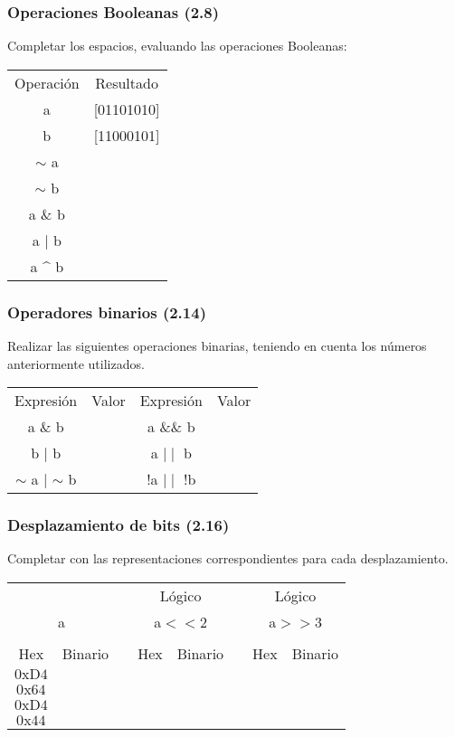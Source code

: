 \subsubsection{ Operaciones Booleanas (2.8)}
Completar los espacios, evaluando las operaciones Booleanas:\\

\begin{tabular}{cc}
  Operación&Resultado\\
  a&[01101010]\\
  b&[11000101]\\
  $\sim$ a&\underspace \\
  $\sim$ b&\underspace \\
  a \& b&\underspace\\
  a $\mid$ b&\underspace\\
  a \^{} b&\underspace\\
\end{tabular}

\subsubsection{Operadores binarios (2.14)}
Realizar las siguientes operaciones binarias, teniendo en cuenta los números anteriormente utilizados.\\

\begin{tabular}{cccc}
  Expresión&Valor&Expresión&Valor\\
  a \& b&\underspace &a \&\& b &\underspace\\
  b $\mid$ b&\underspace& a $\mid\mid$ b &\underspace\\
  $\sim$ a $\mid$ $\sim$ b&\underspace& !a $\mid\mid$ !b &\underspace \\
\end{tabular}


\subsubsection{Desplazamiento de bits (2.16)}
Completar con las representaciones correspondientes para cada desplazamiento.\\

\begin{tabular}{cccccccc}
  \multicolumn{2}{c}{ }& &\multicolumn{2}{c}{Lógico}& &\multicolumn{2}{c}{Lógico}\\
  \multicolumn{2}{c}{a}& &\multicolumn{2}{c}{a$<<$2}& &\multicolumn{2}{c}{a$>>$3}\\
  \cline{1-2}\cline{4-5}\cline{7-8}\\
  Hex&Binario&&Hex&Binario&&Hex&Binario\\
  $\mathrm{0xD4}$&\underspace&&\underspace &\underspace &&\underspace &\underspace\\
  $\mathrm{0x64}$&\underspace&&\underspace &\underspace &&\underspace &\underspace\\
  $\mathrm{0xD4}$&\underspace&&\underspace &\underspace &&\underspace &\underspace\\
  $\mathrm{0x44}$&\underspace&&\underspace &\underspace &&\underspace &\underspace\\
\end{tabular}

